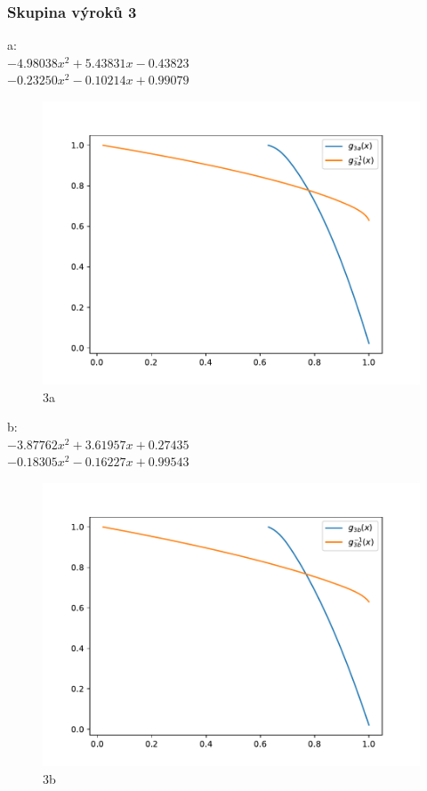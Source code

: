 \subsubsection{Skupina výrok\r u 3}
a:\\
$-4.98038x^2+5.43831x-0.43823$\\
$-0.23250x^2-0.10214x+0.99079$\\
\begin{figure}[H]
    \caption{3a}
        \hspace{-1cm}
        \includegraphics[scale=0.5]{template-fig/p4.pdf}
        \centering
\end{figure}
b:\\
$-3.87762x^2+3.61957x+0.27435$\\
$-0.18305x^2-0.16227x+0.99543$\\
\begin{figure}[H]
    \caption{3b}
        \hspace{-1cm}
        \includegraphics[scale=0.5]{template-fig/p5.pdf}
        \centering
\end{figure}
